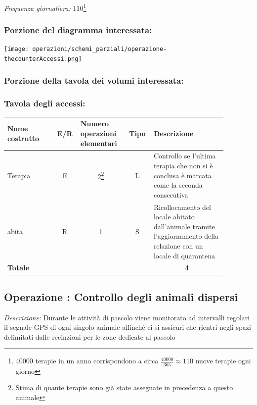 \documentclass[12pt,a4paper]{article}
\begin{document}
\noindent\textit{Frequenza giornaliera:} 110\footnote{40000 terapie in un anno corrispondono a circa $\frac{40000}{365}\approx 110$ nuove terapie ogni giorno}

\subsubsection*{Porzione del diagramma interessata:}

\texttt{[image: operazioni/schemi\_parziali/operazione-\\thecounterAccessi.png]} 
\subsubsection*{Porzione della tavola dei volumi interessata:}

\subsubsection*{Tavola degli accessi:}

\begin{center}\setlength{\extrarowheight}{1.5pt}\begin{longtable}{|p{0.2\linewidth}|p{0.1\linewidth}|p{0.175\linewidth}|p{0.1\linewidth}|p{0.3\linewidth}|}\hline \textbf{Nome costrutto}   & \multicolumn{1}{|c|}{\textbf{E/R}} & \textbf{Numero operazioni elementari} & \multicolumn{1}{|c|}{\textbf{Tipo}} & \textbf{Descrizione}\\ 
\hline
Terapia
 & 
\multicolumn{1}{|c|}{E}
 & 
\multicolumn{1}{|c|}{2\footnote{Stima di quante terapie sono già state assegnate in precedenza a questo animale}}
 & 
\multicolumn{1}{|c|}{L}
 & 
Controllo se l'ultima terapia che non si è conclusa è marcata come la seconda consecutiva
\\
\hline
abita
 & 
\multicolumn{1}{|c|}{R}
 & 
\multicolumn{1}{|c|}{1}
 & 
\multicolumn{1}{|c|}{S}
 & 
Ricollocamento del locale abitato dall'animale tramite l'aggiornamento della relazione con un locale di quarantena
\\
\hline
\multicolumn{4}{|l|}{\textbf{Totale}}
 & 
\multicolumn{1}{|c|}{\textbf{4}}
\\
\hline
\end{longtable}\end{center}

\subsection*{Operazione \thecounterAccessi{}: Controllo degli animali dispersi}
\noindent\textit{Descrizione:} Durante le attività di pascolo viene monitorato ad intervalli regolari il segnale GPS di ogni singolo animale affinchè ci si assicuri che rientri negli spazi delimitati dalle recinzioni per le zone dedicate al pascolo
\end{document}
